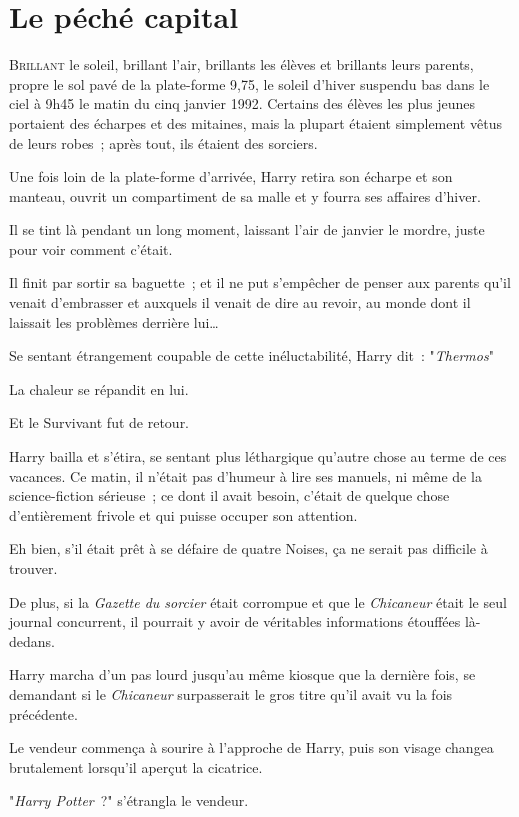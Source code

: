 \chapter{Le péché capital}

\lettrine{B}{rillant} le soleil, brillant l'air, brillants les élèves et brillants leurs parents, propre le sol pavé de la plate-forme 9,75, le soleil d'hiver suspendu bas dans le ciel à 9h45 le matin du cinq janvier 1992. Certains des élèves les plus jeunes portaient des écharpes et des mitaines, mais la plupart étaient simplement vêtus de leurs robes~; après tout, ils étaient des sorciers.

Une fois loin de la plate-forme d'arrivée, Harry retira son écharpe et son manteau, ouvrit un compartiment de sa malle et y fourra ses affaires d'hiver.

Il se tint là pendant un long moment, laissant l'air de janvier le mordre, juste pour voir comment c'était.

Il finit par sortir sa baguette~; et il ne put s'empêcher de penser aux parents qu'il venait d'embrasser et auxquels il venait de dire au revoir, au monde dont il laissait les problèmes derrière lui…

Se sentant étrangement coupable de cette inéluctabilité, Harry dit~: "\emph{Thermos}"

La chaleur se répandit en lui.

Et le Survivant fut de retour.

Harry bailla et s'étira, se sentant plus léthargique qu'autre chose au terme de ces vacances. Ce matin, il n'était pas d'humeur à lire ses manuels, ni même de la science-fiction sérieuse~; ce dont il avait besoin, c'était de quelque chose d'entièrement frivole et qui puisse occuper son attention.

Eh bien, s'il était prêt à se défaire de quatre Noises, ça ne serait pas difficile à trouver.

De plus, si la \emph{Gazette du sorcier} était corrompue et que le \emph{Chicaneur} était le seul journal concurrent, il pourrait y avoir de véritables informations étouffées là-dedans.

Harry marcha d'un pas lourd jusqu'au même kiosque que la dernière fois, se demandant si le \emph{Chicaneur} surpasserait le gros titre qu'il avait vu la fois précédente.

Le vendeur commença à sourire à l'approche de Harry, puis son visage changea brutalement lorsqu'il aperçut la cicatrice.

"\emph{Harry Potter}~?" s'étrangla le vendeur.

